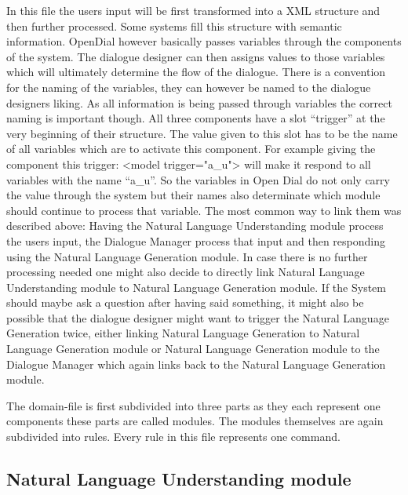 In this file the users input will be first transformed into a XML structure and then further processed.
Some systems fill this structure with semantic information. 
OpenDial however basically passes variables through the components of the system. 
The dialogue designer can then assigns values to those variables which will ultimately determine the flow of the dialogue. 
There is a convention for the naming of the variables, they can however be named to the dialogue designers liking. 
As all information is being passed through variables the correct naming is important though. 
All three components have a slot “trigger” at the very beginning of their structure. 
The value given to this slot has to be the name of all variables which are to activate this component.
For example giving the component this trigger: <model trigger="a_u"> will make it respond to all variables with the name “a_u”. 
So the variables in Open Dial do not only carry the value through the system but their names also determinate which module should continue to process that variable. The most common way to link them was described above: Having the Natural Language Understanding module process the users input, the Dialogue Manager process that input and then responding using the Natural Language Generation module. 
In case there is no further processing needed one might also decide to directly link Natural Language Understanding module to Natural Language Generation module. 
If the System should maybe ask a question after having said something, it might also be possible that the dialogue designer might want to trigger the Natural Language Generation twice, either linking Natural Language Generation to Natural Language Generation module or Natural Language Generation module to the Dialogue Manager which again links back to the Natural Language Generation module.

The domain-file is first subdivided into three parts as they each represent one components these parts are called modules. 
The modules themselves are again subdivided into rules. Every rule in this file represents one command. 

\subsection{Natural Language Understanding module}

